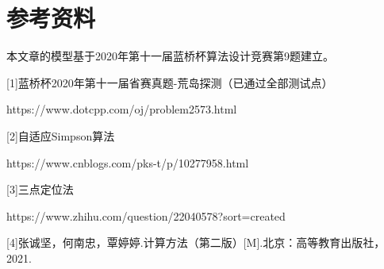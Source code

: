 \documentclass[UTF8]{ctexart}
\begin{document}
	\section{参考资料}
	
	本文章的模型基于2020年第十一届蓝桥杯算法设计竞赛第9题建立。
	
		
		[1]蓝桥杯2020年第十一届省赛真题-荒岛探测（已通过全部测试点）
		
		https://www.dotcpp.com/oj/problem2573.html
		
		[2]自适应Simpson算法
		
		https://www.cnblogs.com/pks-t/p/10277958.html
		
		[3]三点定位法
		
		https://www.zhihu.com/question/22040578?sort=created
		
		[4]张诚坚，何南忠，覃婷婷.计算方法（第二版）[M].北京：高等教育出版社，2021.
		
\end{document}
